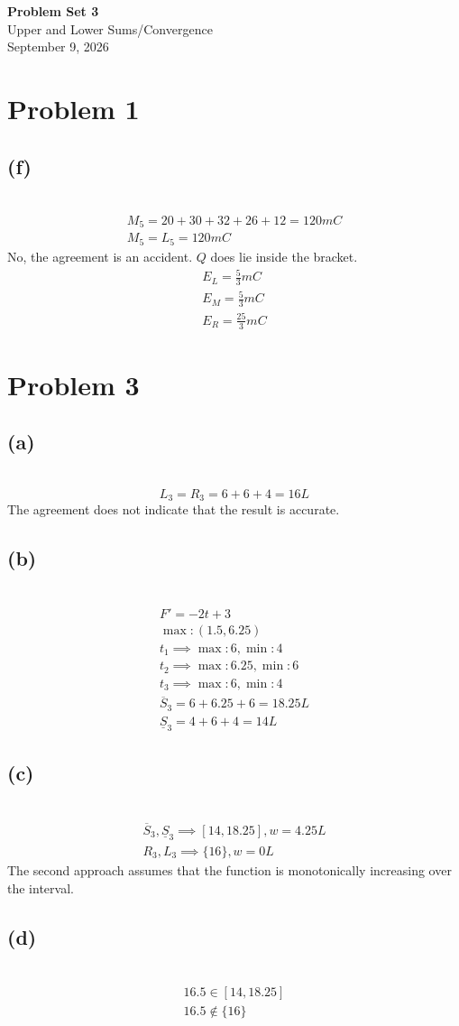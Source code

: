 \documentclass[12pt]{article}
\newcommand{\vem}{\vspace{0.5em}}
\newcommand{\problem}[1]{\section{Problem #1}}
\newcommand{\subproblem}[1]{\subsection{(#1)} \,}
\begin{document}
\vspace*{0cm}

\begin{center}
    {\Large \bfseries Problem Set 3} \\[0.5cm]
    {\large Upper and Lower Sums/Convergence} \\[0.35cm]
    {\normalsize September 9, 2026}
\end{center}


\problem{1}

\subproblem{f}
\begin{gather*}
    M_5=20+30+32+26+12=120mC\\
    M_5=L_5=120mC
\end{gather*}
No, the agreement is an accident. $Q$ does lie inside the bracket.
\begin{gather*}
    E_L=\frac{5}{3}mC\\
    E_M=\frac{5}{3}mC\\
    E_R=\frac{25}{3}mC
\end{gather*}

\problem{3}

\subproblem{a}
\[
L_3=R_3=6+6+4=16L
\]
The agreement does not indicate that the result is accurate.\vem

\subproblem{b}
\begin{gather*}
    F'=-2t+3\\
    \max:(1.5,6.25)\\
    t_1 \implies \max : 6, \min :4\\
    t_2 \implies \max : 6.25, \min :6\\
    t_3 \implies \max : 6, \min :4\\
    \overline{S}_3=6+6.25+6=18.25L\\
    \underline{S}_3=4+6+4=14L  
\end{gather*}

\subproblem{c}
\begin{gather*}
    \overline{S}_3,\underline{S}_3 \implies [14,18.25], w=4.25L\\
    R_3,L_3\implies \{16\}, w=0L
\end{gather*}
The second approach assumes that the function is monotonically increasing over the interval.\vem

\subproblem{d}
\begin{gather*}
    16.5 \in [14,18.25]\\
    16.5 \notin \{16\}
\end{gather*}
\end{document}
